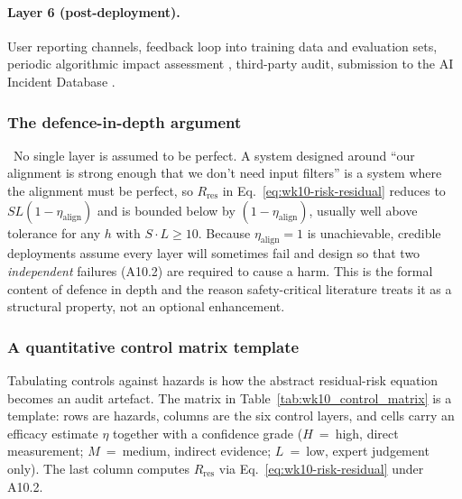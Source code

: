 \paragraph{Layer 6 (post-deployment).} User reporting channels,
feedback loop into training data and evaluation sets,
periodic algorithmic impact assessment
\citep{metcalf2021algorithmic}, third-party audit, submission
to the AI Incident Database \citep{aiid}.

\subsubsection{The defence-in-depth argument}

\Cons\ No single layer is assumed to be perfect. A system
designed around ``our alignment is strong enough that we don't
need input filters'' is a system where the alignment must be
perfect, so $R_\mathrm{res}$ in
Eq.~\eqref{eq:wk10-risk-residual} reduces to
$S L (1 - \eta_\mathrm{align})$ and is bounded below by
$(1 - \eta_\mathrm{align})$, usually well above tolerance for
any $h$ with $S \cdot L \ge 10$. Because
$\eta_\mathrm{align} = 1$ is unachievable, credible deployments
assume every layer will sometimes fail and design so that two
\emph{independent} failures (A10.2) are required to cause a harm.
This is the formal content of defence in depth and the reason
safety-critical literature treats it as a structural property,
not an optional enhancement.

\subsubsection{A quantitative control matrix template}
\label{sec:wk10_control_matrix}

Tabulating controls against hazards is how the abstract
residual-risk equation becomes an audit artefact. The matrix in
Table~\ref{tab:wk10_control_matrix} is a template: rows are
hazards, columns are the six control layers, and cells carry an
efficacy estimate $\eta$ together with a confidence grade
($H$~=~high, direct measurement; $M$~=~medium, indirect evidence;
$L$~=~low, expert judgement only). The last column computes
$R_\mathrm{res}$ via
Eq.~\eqref{eq:wk10-risk-residual} under A10.2.


